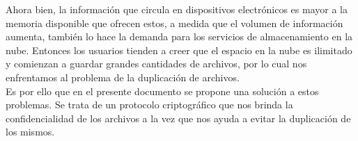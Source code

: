 Ahora bien, la información que circula en dispositivos electrónicos es mayor a la memoria disponible que ofrecen estos, a medida que el volumen de información aumenta, también lo hace la demanda para los servicios de almacenamiento en la nube. Entonces los usuarios tienden a creer que el espacio en la nube es ilimitado y comienzan a guardar grandes cantidades de archivos, por lo cual nos enfrentamos al problema de la duplicación de archivos. \\ 

Es por ello que en el presente documento se propone una solución a estos problemas. Se trata de un protocolo criptográfico que nos brinda la confidencialidad de los archivos a la vez que nos ayuda a evitar la duplicación de los mismos. \\






